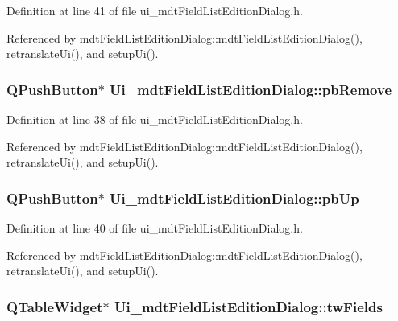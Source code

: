 Definition at line 41 of file ui\-\_\-mdt\-Field\-List\-Edition\-Dialog.\-h.



Referenced by mdt\-Field\-List\-Edition\-Dialog\-::mdt\-Field\-List\-Edition\-Dialog(), retranslate\-Ui(), and setup\-Ui().

\hypertarget{class_ui__mdt_field_list_edition_dialog_a99ff300636037c36c9930d00b97b46f0}{
\subsubsection[{pb\-Remove}]{\setlength{\rightskip}{0pt plus 5cm}Q\-Push\-Button$\ast$ Ui\-\_\-mdt\-Field\-List\-Edition\-Dialog\-::pb\-Remove}}\label{class_ui__mdt_field_list_edition_dialog_a99ff300636037c36c9930d00b97b46f0}


Definition at line 38 of file ui\-\_\-mdt\-Field\-List\-Edition\-Dialog.\-h.



Referenced by mdt\-Field\-List\-Edition\-Dialog\-::mdt\-Field\-List\-Edition\-Dialog(), retranslate\-Ui(), and setup\-Ui().

\hypertarget{class_ui__mdt_field_list_edition_dialog_a00ad9846b704acd0dabd77c23184f942}{
\subsubsection[{pb\-Up}]{\setlength{\rightskip}{0pt plus 5cm}Q\-Push\-Button$\ast$ Ui\-\_\-mdt\-Field\-List\-Edition\-Dialog\-::pb\-Up}}\label{class_ui__mdt_field_list_edition_dialog_a00ad9846b704acd0dabd77c23184f942}


Definition at line 40 of file ui\-\_\-mdt\-Field\-List\-Edition\-Dialog.\-h.



Referenced by mdt\-Field\-List\-Edition\-Dialog\-::mdt\-Field\-List\-Edition\-Dialog(), retranslate\-Ui(), and setup\-Ui().

\hypertarget{class_ui__mdt_field_list_edition_dialog_ab2c5007bf0c170cb34932ce743889b05}{
\subsubsection[{tw\-Fields}]{\setlength{\rightskip}{0pt plus 5cm}Q\-Table\-Widget$\ast$ Ui\-\_\-mdt\-Field\-List\-Edition\-Dialog\-::tw\-Fields}}\label{class_ui__mdt_field_list_edition_dialog_ab2c5007bf0c170cb34932ce743889b05}



